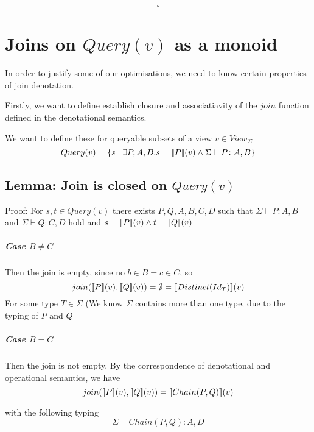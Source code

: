 \documentclass[12pt,a4paper,twoside,openright]{report}
\newcommand{\db}[1]{{\bf [\![}#1{\bf ]\!]}}
\newcommand{\deno}[1]{\db{#1}(v)}
\newcommand{\setComp}[2]{\left\lbrace #1 \mid #2 \right\rbrace}
\newcommand{\typeRule}[2]{\Sigma\vdash #1 \colon #2}
\newcommand{\query}[0]{Query(v)}
\begin{document}
{{$$\square$$

\chapter{Joins on $\query$ as a monoid}

In order to justify some of our optimisations, we need to know certain properties of join denotation.

Firstly, we want to define establish closure and associatiavity of the $join$ function defined in the denotational semantics.

We want to define these for queryable subsets of a view $v \in View_{\Sigma}$
\begin{equation}
	Query(v) = \setComp{s}{\exists P, A, B. s = \deno{P} \wedge \typeRule{P}{A, B}}
\end{equation}

\section{Lemma: Join is closed on $\query$}
Proof:
For $s, t \in Query(v)$ there exists $P, Q, A, B, C, D$ such that $\typeRule{P}{A, B}$ and $\typeRule{Q}{C, D}$ hold and $s = \deno{P} \wedge t = \deno{Q}$

\paragraph{Case $B \neq C$}
	Then the join is empty, since no $b \in B = c \in C$, so 
	\begin{equation}
		join(\deno{P},\deno{Q}) = \emptyset = \deno{Distinct(Id_T)}
	\end{equation}
	For some type $T \in \Sigma$ (We know $\Sigma$ contains more than one type, due to the typing of $P$ and $Q$

 
\paragraph{Case $B = C$}
	Then the join is not empty.
	By the correspondence of denotational and operational semantics, we have
	\begin{equation}
		join(\deno{P}, \deno{Q}) = \deno{Chain(P, Q)}
	\end{equation}
	
	with the following typing
	\begin{equation}
	\typeRule{Chain(P, Q)}{A, D}
	\end{equation}
	 
}}
\end{document}

